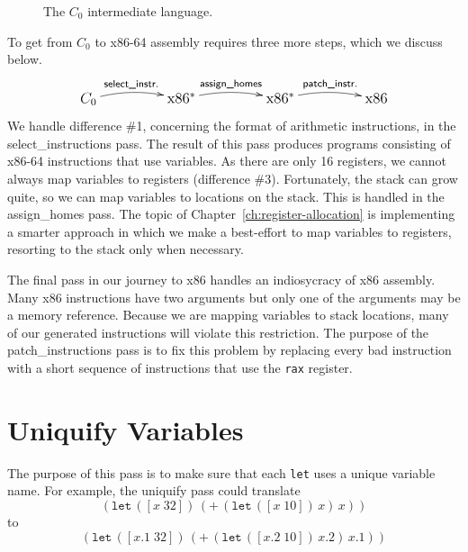 \documentclass[12pt]{book}
\newcommand{\itm}[1]{\ensuremath{\mathit{#1}}}
\newcommand{\Stmt}{\itm{stmt}}
\newcommand{\Exp}{\itm{exp}}
\newcommand{\Prog}{\itm{prog}}
\newcommand{\Arg}{\itm{arg}}
\newcommand{\Int}{\itm{int}}
\newcommand{\Var}{\itm{var}}
\newcommand{\Op}{\itm{op}}
\newcommand{\key}[1]{\texttt{#1}}
\newcommand{\BINOP}[3]{(\key{#1}\,#2\,#3)}
\newcommand{\LET}[3]{(\key{let}\,([#1\;#2])\,#3)}
\newcommand{\ASSIGN}[2]{(\key{assign}\,#1\;#2)}
\newcommand{\RETURN}[1]{(\key{return}\,#1)}
\begin{document}
\begin{figure}[tbp]
\fbox{
\begin{minipage}{0.96\textwidth}
\[
\begin{array}{lcl}
\Arg &::=& \Int \mid \Var \\
\Exp &::=& \Arg \mid (\Op \; \Arg^{*})\\
\Stmt &::=& \ASSIGN{\Var}{\Exp} \mid \RETURN{\Arg} \\
\Prog & ::= & (\key{program}\;\itm{info}\;\Stmt^{+})
\end{array}
\]
\end{minipage}
}
\caption{The $C_0$ intermediate language.}
\label{fig:c0-syntax}
\end{figure}


To get from $C_0$ to x86-64 assembly requires three more steps, which
we discuss below.
\[\large
\xymatrix@=50pt{
  C_0 \ar@/^/[r]^-{\textsf{select\_instr.}}
  & \text{x86}^{*} \ar@/^/[r]^-{\textsf{assign\_homes}} 
  & \text{x86}^{*} \ar@/^/[r]^-{\textsf{patch\_instr.}}
  & \text{x86}
}
\]
We handle difference \#1, concerning the format of arithmetic
instructions, in the \textsf{select\_instructions} pass.  The result
of this pass produces programs consisting of x86-64 instructions that
use variables.
%
As there are only 16 registers, we cannot always map variables to
registers (difference \#3). Fortunately, the stack can grow quite, so
we can map variables to locations on the stack. This is handled in the
\textsf{assign\_homes} pass. The topic of
Chapter~\ref{ch:register-allocation} is implementing a smarter
approach in which we make a best-effort to map variables to registers,
resorting to the stack only when necessary.

The final pass in our journey to x86 handles an indiosycracy of x86
assembly. Many x86 instructions have two arguments but only one of the
arguments may be a memory reference. Because we are mapping variables
to stack locations, many of our generated instructions will violate
this restriction. The purpose of the \textsf{patch\_instructions} pass
is to fix this problem by replacing every bad instruction with a short
sequence of instructions that use the \key{rax} register.

\section{Uniquify Variables}

The purpose of this pass is to make sure that each \key{let} uses a
unique variable name. For example, the \textsf{uniquify} pass could
translate
\[
\LET{x}{32}{ \BINOP{+}{ \LET{x}{10}{x} }{ x } }
\]
to
\[
\LET{x.1}{32}{ \BINOP{+}{ \LET{x.2}{10}{x.2} }{ x.1 } }
\]
\end{document}

